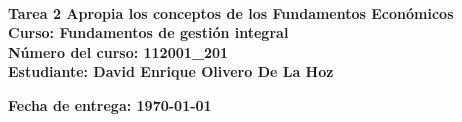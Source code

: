 \begin{titlepage}
    \centering
    \fontsize{12pt}{14}\

    \vspace{3cm}
    \normalsize \textbf{\huge Tarea 2 Apropia los conceptos de los Fundamentos Económicos} \\
    \normalsize \textbf{Curso: Fundamentos de gestión integral} \\
    \normalsize \textbf{Número del curso: 112001\_201} \\
    \normalsize \textbf{Estudiante: David Enrique Olivero De La Hoz}
    
    \vfil
    \begin{flushright}
        \normalsize \textbf{Fecha de entrega: \today}
    \end{flushright}
    \normalsize \textbf{}
\end{titlepage}